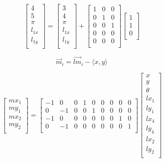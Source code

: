 \documentclass[prodmode,acmtecs]{acmsmall} %
\begin{document}
$$
\begin{bmatrix}
    4 \\
    5 \\
    \pi \\
    l_{1x} \\
    l_{1y} \\
\end{bmatrix}
=
\begin{bmatrix}
    3 \\
    4 \\
    \pi  \\
    l_{1x} \\
    l_{1y} \\
\end{bmatrix}
+
\begin{bmatrix}
    1 & 0 & 0  \\
    0 & 1 & 0  \\
    0 & 0 & 1  \\
    0 & 0 & 0  \\
    0 & 0 & 0  \\
\end{bmatrix}
\begin{bmatrix}
    1 \\
    1 \\
    0 \\
\end{bmatrix}
$$

$$
\vec{m}_i = \vec{lm}_i - \langle x, y \rangle
$$

$$
\begin{bmatrix}
    mx_1 \\
    my_1 \\
    mx_2 \\
    my_2 \\
\end{bmatrix}
=
\begin{bmatrix}
    -1 & 0 & 0 & 1 & 0 & 0 & 0 & 0 & 0 \\
    0 & -1 & 0 & 0 & 1 & 0 & 0 & 0 & 0 \\
    -1 & 0 & 0 & 0 & 0 & 0 & 0 & 1 & 0 \\
    0 & -1 & 0 & 0 & 0 & 0 & 0 & 0 & 1 \\
\end{bmatrix}
\begin{bmatrix}
    x \\
    y \\
    \theta \\
    lx_1 \\
    ly_1 \\
    lx_4 \\
    ly_4 \\
    lx_2 \\
    ly_2 \\
\end{bmatrix}
$$
\end{document}

